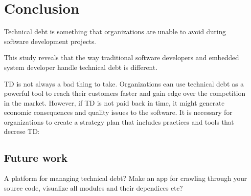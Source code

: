 \chapter{Conclusion}
Technical debt is something that organizations are unable to avoid during software development projects.

This study reveals that the way traditional software developers and embedded system developer handle technical debt is different. 

TD is not always a bad thing to take. Organizations can use technical debt as a powerful tool to reach their customers faster and gain edge over the competition in the market. However, if TD is not paid back in time, it might generate economic consequences and quality issues to the software. It is necessary for organizations to create a strategy plan that includes practices and tools that decrese TD:

\section{Future work}
A platform for managing technical debt? Make an app for crawling through your source code, visualize all modules and their dependices etc?